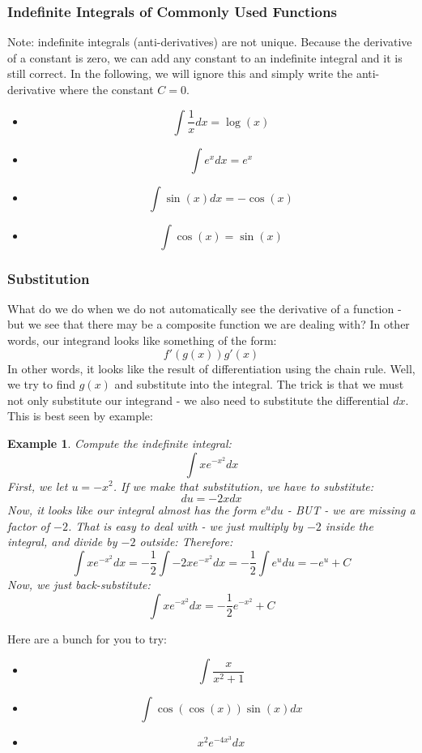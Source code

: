 \documentclass[12pt,a4paper]{article} %
\newtheorem{example}{Example}
\begin{document}
\subsubsection{Indefinite Integrals of Commonly Used Functions}
Note: indefinite integrals (anti-derivatives) are not unique. Because the derivative of a constant is zero, we can add any constant to an indefinite integral and it is still correct. In the following, we will ignore this and simply write the anti-derivative where the constant $C=0$. 
\begin{itemize}
\item $$\int \frac1{x} dx = \log(x)$$
\item $$\int e^x dx= e^x$$
\item $$\int \sin(x) dx = -\cos(x)$$
\item $$\int \cos(x) = \sin(x)$$
\end{itemize}
\subsubsection{Substitution}
What do we do when we do not automatically see the derivative of a function - but we see that there may be a composite function we are dealing with? In other words, our integrand looks like something of the form:
$$f'(g(x))g'(x)$$
In other words, it looks like the result of differentiation using the chain rule. Well, we try to find $g(x)$ and substitute into the integral. The trick is that we must not only substitute our integrand - we also need to substitute the differential $dx$. This is best seen by example:
\begin{example}
Compute the indefinite integral:
$$\int x e^{-x^2} dx$$
First, we let $u=-x^2$. If we make that substitution, we have to substitute:
$$du = -2x dx$$ 
Now, it looks like our integral \emph{almost} has the form $e^{u} du$ - BUT - we are missing a factor of $-2$. That is easy to deal with - we just multiply by $-2$ inside the integral, and divide by $-2$ outside: 
Therefore:
$$\int x e^{-x^2} dx = -\frac12 \int -2x e^{-x^2}dx = -\frac12\int e^u du = -e^u + C$$
Now, we just back-substitute:
$$\int x e^{-x^2} dx = -\frac12e^{-x^2} + C$$
\end{example}
Here are a bunch for you to try:
\begin{itemize}
\item $$\int \frac{x}{x^2+1}$$
\item $$\int \cos(\cos(x))\sin(x)dx$$
\item $$x^2 e^{-4x^3}dx$$
\end{itemize}
\end{document}
